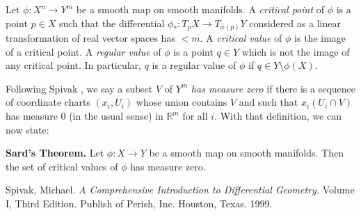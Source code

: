 \documentclass[12pt]{article}
\begin{document}
Let $\phi : X^n \rightarrow Y^m$ be a smooth map on smooth manifolds. A {\it critical point} of $\phi$ is a point $p\in X$ such that the differential $\phi_* : T_pX \rightarrow T_{\phi(p)}Y$ considered as a linear transformation of real vector spaces has  $<m$. A {\it critical value} of $\phi$ is the image of a critical point. A {\it regular value} of $\phi$ is a point $q\in Y$ which is not the image of any critical point. In particular, $q$ is a regular value of $\phi$ if $q\in Y \setminus \phi(X)$.

Following Spivak \cite{Spivak}, we say a subset $V$ of $Y^m$ \emph{has measure zero} if there is a sequence of coordinate charts $(x_i,U_i)$ whose union contains $V$ and such that $x_i(U_i\cap V)$ has measure 0 (in the usual sense) in $\mathbb{R}^m$ for all $i$.  With that definition, we can now state:

{\bf Sard's Theorem.} Let $\phi : X \rightarrow Y$ be a smooth map on smooth manifolds. Then the set of critical values of $\phi$ has measure zero.

\begin{thebibliography}{9}
 Spivak, Michael.  \emph{A Comprehensive Introduction to Differential Geometry.}  Volume I, Third Edition.  Publish of Perish, Inc.  Houston, Texas.  1999.
\end{thebibliography}
\end{document}
